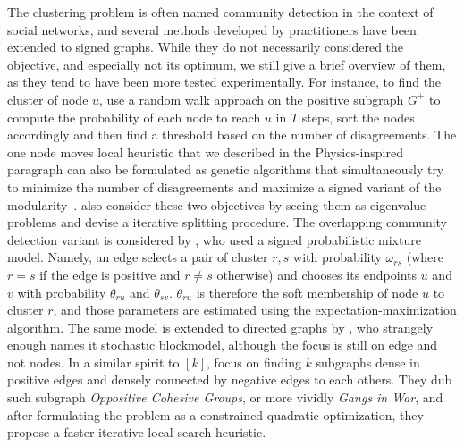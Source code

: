 The clustering problem is often named community detection in the context of social networks, and
several methods developed by practitioners have been extended to signed graphs. While they do not
necessarily considered the \pcc{} objective, and especially not its optimum, we still give a brief
overview of them, as they tend to have been more tested experimentally. For instance, to find the
cluster of node $u$, \textcite{Yang2007} use a random walk approach on the positive subgraph $G^+$
to compute the probability of each node to reach $u$ in $T$ steps, sort the nodes accordingly and
then find a threshold  based on the number of disagreements.
The one node moves local heuristic that we described in the Physics-inspired paragraph
 can also be formulated as genetic algorithms that simultaneously try to
minimize the number of disagreements and maximize a signed variant of the
modularity~\autocites{Li2013}{Amelio2013}. \Textcite{Anchuri2012} also consider these two objectives
by seeing them as eigenvalue problems and devise a iterative splitting procedure.
The overlapping community detection variant is considered by \textcite{Chen14}, who used a signed
probabilistic mixture model. Namely, an edge selects a pair of cluster $r,s$ with probability
$\omega_{rs}$ (where $r=s$ if the edge is positive and $r\neq s$ otherwise) and chooses its endpoints
$u$ and $v$ with probability $\theta_{ru}$ and $\theta_{sv}$. $\theta_{ru}$ is therefore the soft
membership of node $u$ to cluster $r$, and those parameters are estimated using the
expectation-maximization algorithm. The same model is extended to directed graphs by
\textcite{Jiang2015}, who strangely enough names it stochastic blockmodel, although the focus is
still on edge and not nodes.
In a similar spirit to \maxa{}$[k]$, \textcite{SignedGang} focus on finding $k$ subgraphs dense in
positive edges and densely connected by negative edges to each others. They dub such subgraph
\emph{Oppositive Cohesive Groups}, or more vividly \emph{Gangs in War}, and after formulating the
problem as a constrained quadratic optimization, they propose a faster iterative local search
heuristic.
